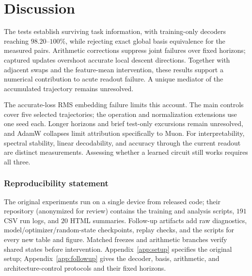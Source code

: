 \documentclass{article}
\begin{document}
\section{Discussion}
\label{sec:discussion}

The tests establish surviving task information, with training-only decoders reaching $98.20$--$100\%$, while rejecting exact global basis equivalence for the measured pairs. Arithmetic corrections suppress joint failures over fixed horizons; captured updates overshoot accurate local descent directions. Together with adjacent swaps and the feature-mean intervention, these results support a numerical contribution to acute readout failure. A unique mediator of the accumulated trajectory remains unresolved.

The accurate-loss RMS embedding failure limits this account. The main controls cover five selected trajectories; the operation and normalization extensions use one seed each. Longer horizons and brief test-only excursions remain unresolved, and AdamW collapses limit attribution specifically to Muon. For interpretability, spectral stability, linear decodability, and accuracy through the current readout are distinct measurements. Assessing whether a learned circuit still works requires all three.

\subsubsection*{Reproducibility statement}
The original experiments run on a single device from released code; their repository (anonymized for review) contains the training and analysis scripts, $191$ CSV run logs, and $20$ HTML summaries. Follow-up artifacts add raw diagnostics, model/optimizer/random-state checkpoints, replay checks, and the scripts for every new table and figure. Matched freezes and arithmetic branches verify shared states before intervention. Appendix~\ref{app:setup} specifies the original setup; Appendix~\ref{app:followup} gives the decoder, basis, arithmetic, and architecture-control protocols and their fixed horizons.

\clearpage



\clearpage
\appendix

\clearpage

\end{document}
